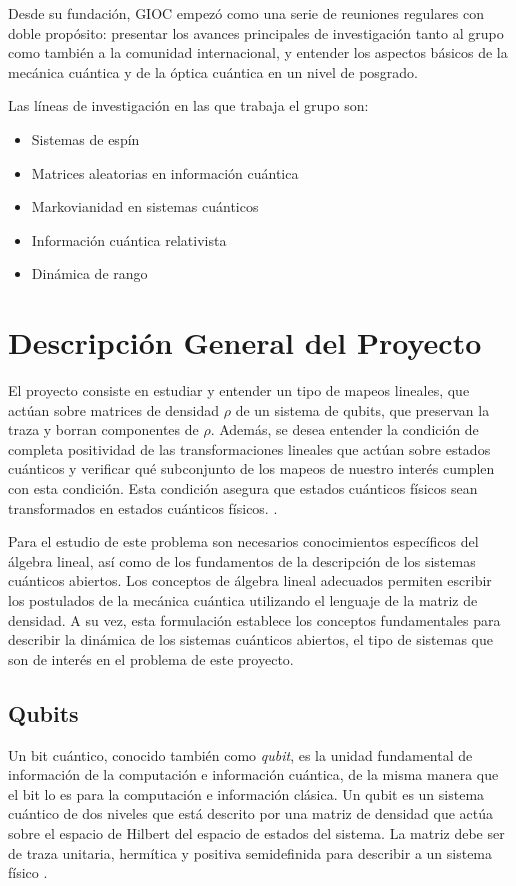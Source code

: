 \documentclass[11pt, spanish, letterpage]{article} %
\newcounter{problem}[section]
\begin{document}
Desde su fundación, GIOC empezó como una serie de reuniones regulares con doble
propósito: presentar los avances principales de investigación tanto al grupo
como también a la comunidad internacional, y entender los aspectos básicos de
la mecánica cuántica y de la óptica cuántica en un nivel de posgrado. 

Las líneas de investigación en las que trabaja el grupo son:
\begin{itemize}
	\item Sistemas de espín
	\item Matrices aleatorias en información cuántica
	\item Markovianidad en sistemas cuánticos
	\item Información cuántica relativista
	\item Dinámica de rango
\end{itemize}
\section{Descripción General del Proyecto} 
El proyecto consiste en estudiar y entender un tipo de mapeos lineales, que actúan
sobre matrices de densidad $\rho$ de un sistema de qubits, que preservan la traza y
borran componentes de $\rho$. Además, se desea entender la condición de completa
positividad de las transformaciones lineales que actúan sobre estados cuánticos y 
verificar qué subconjunto de los mapeos de nuestro interés cumplen con esta condición.
Esta condición asegura que estados cuánticos físicos sean transformados en estados 
cuánticos físicos. . 

Para el estudio de este problema son necesarios conocimientos específicos del álgebra lineal, 
así como de los fundamentos de la descripción de los sistemas cuánticos abiertos. Los conceptos
de álgebra lineal adecuados permiten  escribir los postulados de la mecánica cuántica utilizando
el lenguaje de la matriz de densidad. A su vez, esta formulación establece los conceptos 
fundamentales para describir la dinámica de los sistemas cuánticos abiertos, el tipo de
sistemas que son de interés en el problema de este proyecto.

\subsection{Qubits} %
Un bit cuántico, conocido también como \textit{qubit}, es la unidad fundamental
de información de la computación e información cuántica, de la misma manera que
el bit lo es para la computación e información clásica. Un qubit es un sistema
cuántico de dos niveles que está descrito por una matriz de densidad que
actúa sobre el espacio de Hilbert del espacio de estados del
sistema. La matriz debe ser de traza unitaria, hermítica y positiva
semidefinida para describir a un sistema físico \cite{nielsen_chuang_2011}. 
\end{document}
